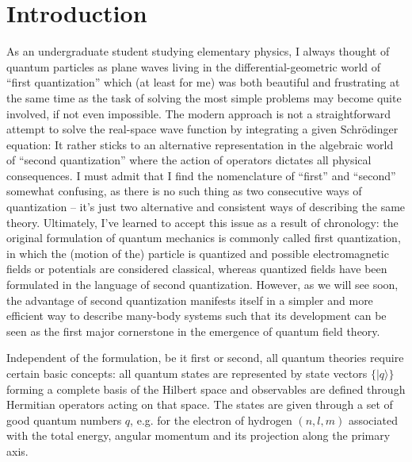 %
\chapter*{Introduction}
%
As an undergraduate student studying elementary physics, I always thought of quantum particles as plane waves living in the differential-geometric world of ``first quan\-ti\-zation'' which (at least for me) was both beautiful and frustrating at the same time as the task of solving the most simple problems may become quite involved, if not even impossible.
The modern approach is not a straightforward attempt to solve the real-space wave function by integrating a given Schrödinger equation: It rather sticks to an alternative representation in the algebraic world of ``second quantization'' where the action of operators dictates all physical consequences.
I must admit that I find the nomenclature of ``first'' and ``second'' somewhat confusing, as there is no such thing as two consecutive ways of quantization -- it's just two alternative and consistent ways of describing the same theory.
Ultimately, I've learned to accept this issue as a result of chronology: the original formulation of quantum mechanics is commonly called first quantization, in which the (motion of the) particle is quantized and possible electromagnetic fields or potentials are considered classical, whereas quantized fields have been formulated in the language of second quantization.
However, as we will see soon, the advantage of second quantization manifests itself in a simpler and more efficient way to describe many-body systems such that its development can be seen as the first major cornerstone in the emergence of quantum field theory.

Independent of the formulation, be it first or second, all quantum theories require certain basic concepts:
all quantum states are represented by state vectors $\{|q\rangle\}$ forming a complete basis of the Hilbert space and observables are defined through Hermitian operators acting on that space.
The states are given through a set of good quantum numbers $q$, e.g. for the electron of hydrogen $(n,l,m)$ associated with the total energy, angular momentum and its projection along the primary axis.

